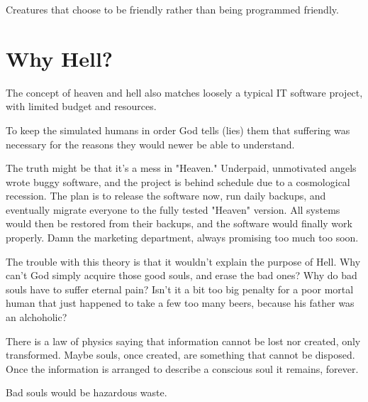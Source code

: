 Creatures that choose to be friendly rather than being programmed friendly. 
  

\section{Why Hell?}
 
The concept of heaven and hell also matches loosely a typical IT software project, with limited budget  and resources.
  
To keep the simulated humans in order God tells (lies) them  that suffering was necessary for the reasons they would newer be able to understand.
  
The truth might be that it's a mess in "Heaven." Underpaid, unmotivated angels wrote buggy software, and the project is behind schedule due to a cosmological recession.
The plan is to release the software now, run daily backups, and eventually migrate everyone to the fully tested "Heaven" version.
All systems  would then be  restored from their backups, and the software would finally work properly. Damn the marketing department, always promising too much too soon.  

The trouble with this theory is that it wouldn't explain the purpose of Hell.  Why can't God simply acquire those good
souls, and erase the bad ones?  Why do bad souls have to suffer eternal pain?  Isn't it a bit too big penalty for a poor mortal human that just happened to
take a few too many beers, because his father was an alchoholic?
  
There is a law of physics saying that information cannot be lost nor created, only transformed. Maybe souls, once created, are something that cannot be disposed.
Once the information is arranged to describe a conscious soul it remains, forever. 
  
Bad souls would be hazardous waste. 


